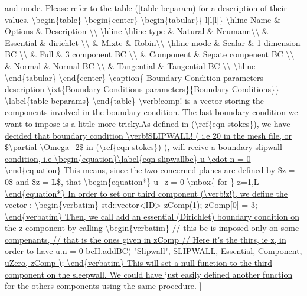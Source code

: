 and mode. Please refer to the table (\ref{table-bcparam) for a description of their values.

\begin{table}
\begin{center}
\begin{tabular}{|l|l|l|}
\hline
Name & Options & Description \\
\hline \hline
type &  Natural & Neumann\\
& Essential & dirichlet \\
& Mixte & Robin\\

\hline
mode & Scalar & 1 dimension BC \\
& Full & 3 component BC \\
& Component  & Sepate compenent BC \\
& Normal & Normal BC \\
& Tangential & Tangential BC \\
\hline

\end{tabular}
\end{center}
\caption{ Boundary Condition parameters description
\ixt{Boundary Conditions parameters}{Boundary Conditions}}
\label{table-bcparams}
\end{table}

\verb!comp! is a vector storing the components involved in the boundary condition.
The last boundary condition we want to impose is a little more tricky.As defined
in (\ref{eqn-stokes}), we have decided that boundary condition \verb!SLIPWALL! ( i.e 20 in the mesh file, or $\partial \Omega_2$ in (\ref{eqn-stokes}) ), will recive
a boundary slipwall condition, i.e
\begin{equation}\label{eqn-slipwallbc}
u \cdot n = 0
\end{equation}
This means, since the two concerned planes are defined by $z = 0$ and $z = L$, that
\begin{equation*}
u_z = 0 \mbox{ for } z=1,L
\end{equation*}
In order to set our third component (\verb!z!), we define the vector :
\begin{verbatim}
    std::vector<ID> zComp(1);
    zComp[0] = 3;
\end{verbatim}
Then, we call add an essential (Dirichlet) boundary condition on the z component by calling
\begin{verbatim}
    // this bc is imposed only on some compenants,
    // that is the ones given in zComp
    // Here it's the thirs, ie z, in order to have u.n = 0
    bcH.addBC( "Slipwall", SLIPWALL, Essential, Component, uZero, zComp );
\end{verbatim}
This will set a null function to the third component on the sleepwall. We could have just easily defined
another function for the others components using the same procedure.

}
